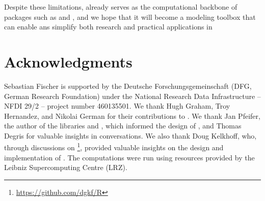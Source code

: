 \documentclass[article,shortnames]{jss}
\begin{document}
\vspace{2\bigskipamount}
Despite these limitations,  already serves as the computational backbone of packages such as  and , and we hope that it will become a modeling toolbox that can enable ans simplify both research and practical applications in 

\section*{Acknowledgments}

Sebastian Fischer is supported by the Deutsche Forschungsgemeinschaft (DFG, German Research Foundation) under the National Research Data Infrastructure -- NFDI 29/2 -- project number 460135501.
We thank Hugh Graham, Troy Hernandez, and Nikolai German for their contributions to .
We thank Jan Pfeifer, the author of the  libraries  \citep{ref-gomlx} and  \citep{ref-gopjrt}, which informed the design of , and Thomas Degris for valuable insights in conversations.
We also thank Doug Kelkhoff, who, through discussions on \footnote{\url{https://github.com/dgkf/R}}, provided valuable insights on the design and implementation of .
The computations were run using resources provided by the Leibniz Supercomputing Centre (LRZ).


\end{document}
